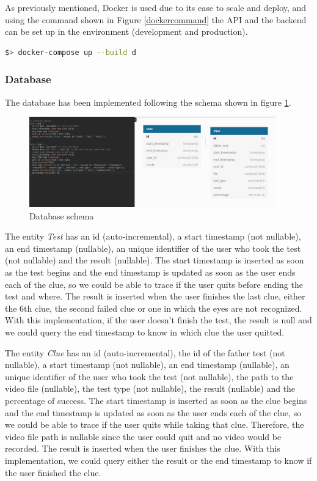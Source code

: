 As previously mentioned, Docker is used due to its ease to scale and deploy, and using the command shown in Figure \ref{dockercommand} the API and the backend can be set up in the environment (development and production).

\begin{lstlisting}[language=bash, mathescape=false, label={dockercommand}, caption={Commands to set the environment up}, captionpos=b]
$> docker-compose up --build d
\end{lstlisting}

\subsubsection{Database}

The database has been implemented following the schema shown in figure \ref{databaseschema}.

\begin{figure}[H]
    \centering
    \includegraphics[width=0.95\textwidth]{./img/db.png}
    \caption{Database schema}
    \label{databaseschema}
\end{figure}

The entity \textit{Test} has an id (auto-incremental), a start timestamp (not nullable), an end timestamp (nullable), an unique identifier of the user who took the test (not nullable) and the result (nullable). The start timestamp is inserted as soon as the test begins and the end timestamp is updated as soon as the user ends each of the clue, so we could be able to trace if the user quits before ending the test and where. The result is inserted when the user finishes the last clue, either the 6th clue, the second failed clue or one in which the eyes are not recognized. With this implementation, if the user doesn't finish the test, the result is null and we could query the end timestamp to know in which clue the user quitted.

The entity \textit{Clue} has an id (auto-incremental), the id of the father test (not nullable), a start timestamp (not nullable), an end timestamp (nullable), an unique identifier of the user who took the test (not nullable), the path to the video file (nullable), the test type (not nullable), the result (nullable) and the percentage of success. The start timestamp is inserted as soon as the clue begins and the end timestamp is updated as soon as the user ends each of the clue, so we could be able to trace if the user quits while taking that clue. Therefore, the video file path is nullable since the user could quit and no video would be recorded. The result is inserted when the user finishes the clue. With this implementation, we could query either the result or the end timestamp to know if the user finished the clue.

